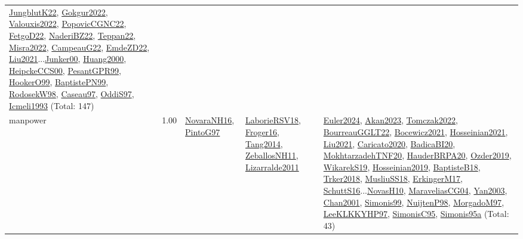 {\begin{longtable}{p{3cm}r>{\raggedright\arraybackslash}p{6cm}>{\raggedright\arraybackslash}p{6cm}>{\raggedright\arraybackslash}p{8cm}}
\hyperref[detail:JungblutK22]{JungblutK22}, \hyperref[detail:Gokgur2022]{Gokgur2022}, \hyperref[detail:Valouxis2022]{Valouxis2022}, \hyperref[detail:PopovicCGNC22]{PopovicCGNC22}, \hyperref[detail:FetgoD22]{FetgoD22}, \hyperref[detail:NaderiBZ22]{NaderiBZ22}, \hyperref[detail:Teppan22]{Teppan22}, \hyperref[detail:Misra2022]{Misra2022}, \hyperref[detail:CampeauG22]{CampeauG22}, \hyperref[detail:EmdeZD22]{EmdeZD22}, \hyperref[detail:Liu2021]{Liu2021}...\hyperref[detail:Junker00]{Junker00}, \hyperref[detail:Huang2000]{Huang2000}, \hyperref[detail:HeipckeCCS00]{HeipckeCCS00}, \hyperref[detail:PesantGPR99]{PesantGPR99}, \hyperref[detail:HookerO99]{HookerO99}, \hyperref[detail:BaptistePN99]{BaptistePN99}, \hyperref[detail:RodosekW98]{RodosekW98}, \hyperref[detail:Caseau97]{Caseau97}, \hyperref[detail:OddiS97]{OddiS97}, \hyperref[detail:Icmeli1993]{Icmeli1993} (Total: 147)\\
\index{manpower}\index{Concepts!manpower}manpower &  1.00 & \hyperref[detail:NovaraNH16]{NovaraNH16}, \hyperref[detail:PintoG97]{PintoG97} & \hyperref[detail:LaborieRSV18]{LaborieRSV18}, \hyperref[detail:Froger16]{Froger16}, \hyperref[detail:Tang2014]{Tang2014}, \hyperref[detail:ZeballosNH11]{ZeballosNH11}, \hyperref[detail:Lizarralde2011]{Lizarralde2011} & \hyperref[detail:Euler2024]{Euler2024}, \hyperref[detail:Akan2023]{Akan2023}, \hyperref[detail:Tomczak2022]{Tomczak2022}, \hyperref[detail:BourreauGGLT22]{BourreauGGLT22}, \hyperref[detail:Bocewicz2021]{Bocewicz2021}, \hyperref[detail:Hosseinian2021]{Hosseinian2021}, \hyperref[detail:Liu2021]{Liu2021}, \hyperref[detail:Caricato2020]{Caricato2020}, \hyperref[detail:BadicaBI20]{BadicaBI20}, \hyperref[detail:MokhtarzadehTNF20]{MokhtarzadehTNF20}, \hyperref[detail:HauderBRPA20]{HauderBRPA20}, \hyperref[detail:Ozder2019]{Ozder2019}, \hyperref[detail:WikarekS19]{WikarekS19}, \hyperref[detail:Hosseinian2019]{Hosseinian2019}, \hyperref[detail:BaptisteB18]{BaptisteB18}, \hyperref[detail:Trker2018]{Trker2018}, \hyperref[detail:MusliuSS18]{MusliuSS18}, \hyperref[detail:ErkingerM17]{ErkingerM17}, \hyperref[detail:SchuttS16]{SchuttS16}...\hyperref[detail:NovasH10]{NovasH10}, \hyperref[detail:MaraveliasCG04]{MaraveliasCG04}, \hyperref[detail:Yan2003]{Yan2003}, \hyperref[detail:Chan2001]{Chan2001}, \hyperref[detail:Simonis99]{Simonis99}, \hyperref[detail:NuijtenP98]{NuijtenP98}, \hyperref[detail:MorgadoM97]{MorgadoM97}, \hyperref[detail:LeeKLKKYHP97]{LeeKLKKYHP97}, \hyperref[detail:SimonisC95]{SimonisC95}, \hyperref[detail:Simonis95a]{Simonis95a} (Total: 43)\\

\end{longtable}}
